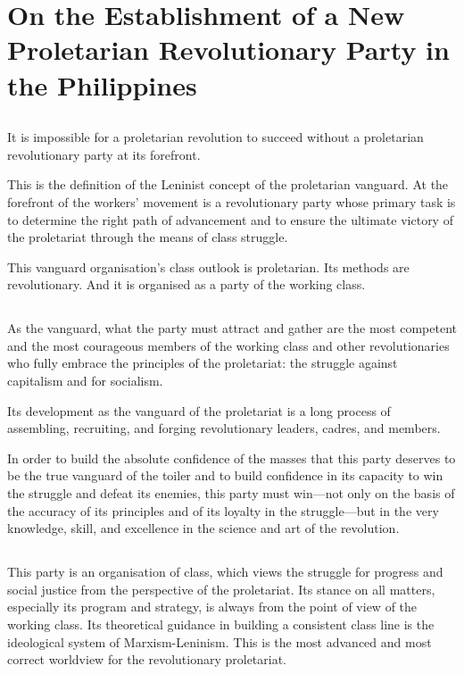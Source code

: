 \chapter{On the Establishment 
of a New Proletarian Revolutionary Party 
in the Philippines}


\section{}
It is impossible for a proletarian revolution 
to succeed 
without a proletarian revolutionary party 
at its forefront.

This is the definition of the Leninist concept 
of the proletarian vanguard. 
At the forefront of the workers' movement 
is a revolutionary party 
whose primary task is 
to determine the right path of advancement 
and to ensure the ultimate victory 
of the proletariat 
through the means of class struggle.

This vanguard organisation's 
class outlook is proletarian. 
Its methods are revolutionary.
And it is organised as a party of the working class.


\section{}
As the vanguard, 
what the party must attract and gather
are the most competent and the most courageous members
of the working class and other revolutionaries
who fully embrace the principles of the proletariat:
the struggle against capitalism and for socialism.

Its development as the vanguard of the proletariat 
is a long process of assembling, recruiting, and forging 
revolutionary leaders, cadres, and members.

In order to build the absolute confidence of the masses 
that this party deserves to be 
the true vanguard of the toiler and 
to build confidence in its capacity to win the struggle 
and defeat its enemies, 
this party must win---not only 
on the basis of the accuracy of its principles 
and of its loyalty in the struggle---but 
in the very knowledge, skill, and excellence 
in the science and art of the revolution. 


\section{}
This party is an organisation of class,
which views the struggle 
for progress and social justice 
from the perspective of the proletariat. 
Its stance on all matters, 
especially its program and strategy, 
is always from the point of view of the working class. 
Its theoretical guidance 
in building a consistent class line 
is the ideological system of Marxism-Leninism. 
This is the most advanced and most correct worldview 
for the revolutionary proletariat.

